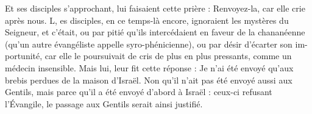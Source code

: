 Et ses disciples s’approchant, lui faisaient cette prière : Renvoyez-la, car elle crie après nous. L, es disciples, en ce temps-là encore, ignoraient les mystères du Seigneur, et c’était, ou par pitié qu’ils intercédaient en faveur de la chananéenne (qu’un autre évangéliste appelle syro-phénicienne), ou par désir d’écarter son im- portunité, car elle le poursuivait de cris de plus en plus pressants, comme un médecin insensible. Mais lui, leur fit cette réponse : Je n'ai été envoyé qu'aux brebis perdues de la maison d'Israël. Non qu’il n’ait pas été envoyé aussi aux Gentils, mais parce qu’il a été envoyé d’abord à Israël : ceux-ci refusant l’Évangile, le passage aux Gentils serait ainsi justifié.
